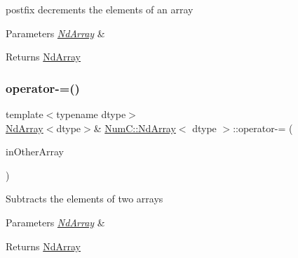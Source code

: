 postfix decrements the elements of an array


\begin{DoxyParams}{Parameters}
{\em \mbox{\hyperlink{class_num_c_1_1_nd_array}{Nd\+Array}}} & \\
\hline
\end{DoxyParams}
\begin{DoxyReturn}{Returns}
\mbox{\hyperlink{class_num_c_1_1_nd_array}{Nd\+Array}} 
\end{DoxyReturn}
\mbox{\label{class_num_c_1_1_nd_array_a2ac18779cb518cfa4dcdff53065426e7}} 
\subsubsection{\texorpdfstring{operator-\/=()}{operator-=()}\hspace{0.1cm}{\footnotesize\ttfamily [1/2]}}
{\footnotesize\ttfamily template$<$typename dtype$>$ \\
\mbox{\hyperlink{class_num_c_1_1_nd_array}{Nd\+Array}}$<$dtype$>$\& \mbox{\hyperlink{class_num_c_1_1_nd_array}{Num\+C\+::\+Nd\+Array}}$<$ dtype $>$\+::operator-\/= (\begin{DoxyParamCaption}\item[{const \mbox{\hyperlink{class_num_c_1_1_nd_array}{Nd\+Array}}$<$ dtype $>$ \&}]{in\+Other\+Array }\end{DoxyParamCaption})\hspace{0.3cm}{\ttfamily [inline]}}

Subtracts the elements of two arrays


\begin{DoxyParams}{Parameters}
{\em \mbox{\hyperlink{class_num_c_1_1_nd_array}{Nd\+Array}}} & \\
\hline
\end{DoxyParams}
\begin{DoxyReturn}{Returns}
\mbox{\hyperlink{class_num_c_1_1_nd_array}{Nd\+Array}} 
\end{DoxyReturn}
\mbox{\label{class_num_c_1_1_nd_array_a96520616f12f0a65f380aabd0e8a8e4e}} 
